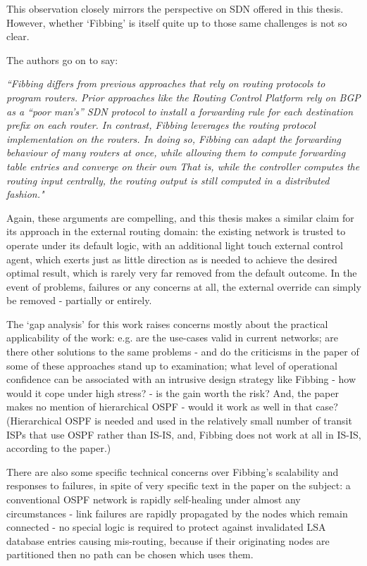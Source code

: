 \smallskip

This observation closely mirrors the perspective on SDN offered in this thesis. However, whether `Fibbing' is itself quite up to those same challenges is not so clear.

\smallskip

The authors go on to say:


\emph{``Fibbing differs from previous approaches that rely on routing protocols to program routers.
Prior approaches like the Routing Control Platform rely on BGP as a “poor man’s” SDN protocol to install a forwarding rule for each destination prefix on each router.
In contrast, Fibbing leverages the routing protocol implementation on the routers.
In doing so, Fibbing can adapt the forwarding behaviour of many routers at once, while allowing them to compute forwarding table entries and converge on their own
That is, while the controller computes the routing input centrally, the routing output is still computed in a distributed fashion."}

\smallskip

Again, these arguments are compelling, and this thesis makes a similar claim for its approach in the external routing domain: the existing network is trusted to operate under its default logic,
with an additional light touch external control agent, which exerts just as little direction as is needed to achieve the desired optimal result, which is rarely very far removed from the default outcome.
In the event of problems, failures or any concerns at all, the external override can simply be removed - partially or entirely.


The `gap analysis' for this work raises concerns mostly about the practical applicability of the work:
e.g. are the use-cases valid in current networks; are there other solutions to the same problems - and do the criticisms in the paper of some of these approaches stand up to examination;
what level of operational confidence can be associated with an intrusive design strategy like Fibbing - how would it cope under high stress? - is the gain worth the risk?
And, the paper makes no mention of hierarchical OSPF - would it work as well in that case? (Hierarchical OSPF is needed and used in the relatively small number of transit ISPs that use OSPF rather than IS-IS, and, Fibbing does not work at all in IS-IS, according to the paper.)


There are also some specific technical concerns over Fibbing's scalability and responses to failures, in spite of very specific text in the paper on the subject: a conventional OSPF network is rapidly self-healing under almost any circumstances - link failures are rapidly propagated by the nodes which remain connected - no special logic is required to protect against invalidated LSA database entries causing mis-routing, because if their originating nodes are partitioned then no path can be chosen which uses them.


